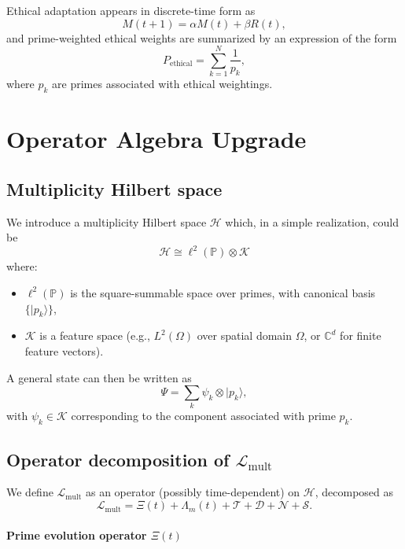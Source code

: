 \documentclass[11pt]{article}
\begin{document}
Ethical adaptation appears in discrete-time form as
\begin{equation}
M(t+1) = \alpha M(t) + \beta R(t),
\end{equation}
and prime-weighted ethical weights are summarized by an expression of the form
\begin{equation}
P_{\mathrm{ethical}} = \sum_{k=1}^N \frac{1}{p_k},
\end{equation}
where $p_k$ are primes associated with ethical weightings.

\section{Operator Algebra Upgrade}

\subsection{Multiplicity Hilbert space}

We introduce a multiplicity Hilbert space $\mathcal{H}$ which, in a simple realization, could be
\[
\mathcal{H} \cong \ell^2(\mathbb{P}) \otimes \mathcal{K}
\]
where:
\begin{itemize}[nosep]
\item $\ell^2(\mathbb{P})$ is the square-summable space over primes, with canonical basis $\{\lvert p_k\rangle\}$,
\item $\mathcal{K}$ is a feature space (e.g., $L^2(\Omega)$ over spatial domain $\Omega$, or $\mathbb{C}^d$ for finite feature vectors).
\end{itemize}

A general state can then be written as
\[
\Psi = \sum_{k} \psi_k \otimes \lvert p_k\rangle,
\]
with $\psi_k \in \mathcal{K}$ corresponding to the component associated with prime $p_k$.

\subsection{Operator decomposition of $\mathcal{L}_{\mathrm{mult}}$}

We define $\mathcal{L}_{\mathrm{mult}}$ as an operator (possibly time-dependent) on $\mathcal{H}$, decomposed as
\begin{equation}
\mathcal{L}_{\mathrm{mult}} =
\Xi(t) + \Lambda_m(t) + \mathcal{T} + \mathcal{D} + \mathcal{N} + \mathcal{S}.
\end{equation}

\paragraph{Prime evolution operator $\Xi(t)$}
\end{document}
